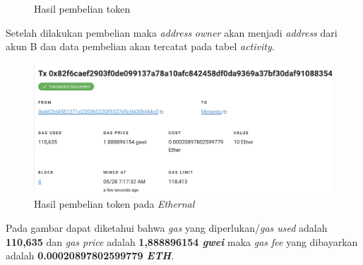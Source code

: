 \begin{itemize}
\begin{figure} [H]
        \caption{Hasil pembelian token}
        \label{fig:TestBuyHasilPembelian}
      \end{figure}
      Setelah dilakukan pembelian maka \emph{address} \emph{owner} akan menjadi \emph{address} dari akun B dan data pembelian akan tercatat pada tabel \emph{activity}.
      \begin{figure} [H] \centering
        \includegraphics[scale=0.4]{gambar/img-test-buy-buy-5.png}
        \caption{Hasil pembelian token pada \emph{Ethernal}}
        \label{fig:TestBuyHasilPembelian2}
      \end{figure}
      Pada gambar dapat diketahui bahwa \emph{gas} yang diperlukan/\emph{gas used} adalah \textbf{110,635} dan \emph{gas price} adalah \textbf{1,888896154 \emph{gwei}} maka \emph{gas fee} yang dibayarkan adalah \textbf{0.00020897802599779 \emph{ETH}}.
    \begin{figure} [H] \centering

\end{figure}
\end{itemize}
